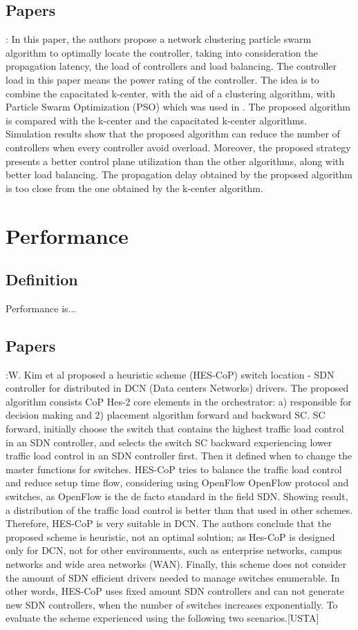 \documentclass[a4paper,10pt]{article}
\begin{document}
\subsection{Papers}
\cite{LiWa15}: In this paper, the authors propose a network clustering particle swarm algorithm to optimally locate the controller, taking into consideration the propagation latency, the load of controllers and load balancing. The controller load in this paper means the power rating of the controller. The idea is to combine the capacitated k-center, with the aid of a clustering algorithm, with Particle Swarm Optimization (PSO) which was used in \cite{GaWa15}. The proposed algorithm is compared with the k-center and the capacitated k-center algorithms. Simulation results show that the proposed algorithm can reduce the number of controllers when every controller avoid overload. Moreover, the proposed strategy presents a better control plane utilization than the other algorithms, along with better load balancing. The propagation delay obtained by the proposed algorithm is too close from the one obtained by the k-center algorithm. 


\section{Performance}
\subsection{Definition}
Performance is...

\subsection{Papers}
\cite{WoLi15}:W. Kim et al proposed a heuristic scheme (HES-CoP) switch location - SDN controller for distributed in DCN (Data centers Networks) drivers. The proposed algorithm consists CoP Hes-2 core elements in the orchestrator: a) responsible for decision making and 2) placement algorithm forward and backward SC. SC forward, initially choose the switch that contains the highest traffic load control in an SDN controller, and selects the switch SC backward experiencing lower traffic load control in an SDN controller first. Then it defined when to change the master functions for switches. HES-CoP tries to balance the traffic load control and reduce setup time flow, considering using OpenFlow OpenFlow protocol and switches, as OpenFlow is the de facto standard in the field SDN. Showing result, a distribution of the traffic load control is better than that used in other schemes. Therefore, HES-CoP is very suitable in DCN. The authors conclude that the proposed scheme is heuristic, not an optimal solution; as Hes-CoP is designed only for DCN, not for other environments, such as enterprise networks, campus networks and wide area networks (WAN). Finally, this scheme does not consider the amount of SDN efficient drivers needed to manage switches enumerable. In other words, HES-CoP uses fixed amount SDN controllers and can not generate new SDN controllers, when the number of switches increases exponentially. To evaluate the scheme experienced using the following two scenarios.[USTA]
\end{document}
